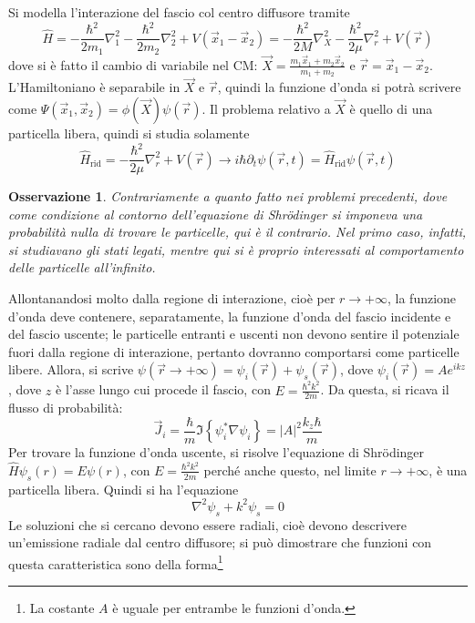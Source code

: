 \documentclass[11pt, a4paper]{scrartcl} %
\numberwithin{equation}{subsection}
\theoremstyle{style2}
\newtheorem{osservazione}{Osservazione}[section]
\theoremstyle{style1}
\begin{document}
Si modella l'interazione del fascio col centro diffusore tramite
\begin{equation}
	\hat{H} = - \frac{\hbar ^2}{2m_1}\nabla ^2_1 - \frac{\hbar ^2}{2m_2} \nabla ^2_2 + V( \vec{x}_1 -\vec{x}_2 )= - \frac{\hbar ^2}{2M}\nabla ^2 _X - \frac{\hbar ^2}{2\mu }\nabla ^2_r + V(\vec{r})
\end{equation}
dove si \`e fatto il cambio di variabile nel CM: $\vec{X} = \frac{m_1\vec{x}_1 + m_2 \vec{x}_2}{m_1+m_2}$ e $\vec{r} = \vec{x}_1 - \vec{x}_2$.
L'Hamiltoniano \`e separabile in $\vec{X}$ e $\vec{r}$, quindi la funzione d'onda si potr\`a scrivere come $\Psi (\vec{x}_1, \vec{x}_2)= \phi (\vec{X}) \psi (\vec{r})$.
Il problema relativo a $\vec{X}$ \`e quello di una particella libera, quindi si studia solamente 
\[
\hat{H}_\text{rid}=- \frac{\hbar ^2}{2\mu }\nabla ^2 _r + V(\vec{r}) \longrightarrow i \hbar \partial _t \psi (\vec{r},t) = \hat{H}_\text{rid}\psi (\vec{r},t)
\] 
\begin{osservazione}
Contrariamente a quanto fatto nei problemi precedenti, dove come condizione al contorno dell'equazione di Shr\"odinger si imponeva una probabilit\`a nulla di trovare le particelle, qui \`e il contrario. Nel primo caso, infatti, si studiavano gli stati legati, mentre qui si \`e proprio interessati al comportamento delle particelle all'infinito.
\end{osservazione}
Allontanandosi molto dalla regione di interazione, cio\`e per $r\to +\infty$, la funzione d'onda deve contenere, separatamente, la funzione d'onda del fascio incidente e del fascio uscente; le particelle entranti e uscenti non devono sentire il potenziale fuori dalla regione di interazione, pertanto dovranno comportarsi come particelle libere. 
Allora, si scrive $\psi (\vec{r}\to +\infty) = \psi _i (\vec{r}) + \psi _s(\vec{r})$, dove $\psi _i(\vec{r}) = A e^{ikz} $, dove $z$ \`e l'asse lungo cui procede il fascio, con $E = \frac{\hbar ^2 k^2}{2m}$.
Da questa, si ricava il flusso di probabilit\`a:
\begin{equation}
\vec{J}_i = \frac{\hbar }{m} \Im \left\{ \psi ^*_i \nabla \psi _i \right\} = \lvert A \rvert ^2 \frac{k_z \hbar }{m}
\end{equation}
Per trovare la funzione d'onda uscente, si risolve l'equazione di Shr\"odinger  $\hat{H}\psi _s(r) = E \psi (r)$, con $E = \frac{\hbar ^2k^2}{2m}$ perch\'e anche questo, nel limite $r \to +\infty$, \`e una particella libera. 
Quindi si ha l'equazione 
\[
\nabla ^2 \psi_s + k^2 \psi_s  = 0
\] 
Le soluzioni che si cercano devono essere radiali, cio\`e devono descrivere un'emissione radiale dal centro diffusore; si pu\`o dimostrare che funzioni con questa caratteristica sono della forma\footnote{La costante $A$ \`e uguale per entrambe le funzioni d'onda.}
\end{document}
